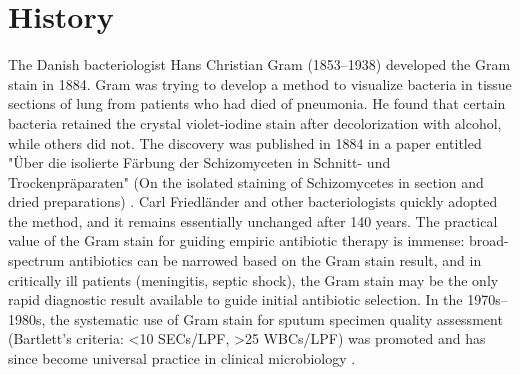 \section*{History}
The Danish bacteriologist Hans Christian Gram (1853--1938) developed the Gram stain in 1884. Gram was trying to develop a method to visualize bacteria in tissue sections of lung from patients who had died of pneumonia. He found that certain bacteria retained the crystal violet-iodine stain after decolorization with alcohol, while others did not. The discovery was published in 1884 in a paper entitled "Über die isolierte Färbung der Schizomyceten in Schnitt- und Trockenpräparaten" (On the isolated staining of Schizomycetes in section and dried preparations) \cite{popescu1996gram}. Carl Friedländer and other bacteriologists quickly adopted the method, and it remains essentially unchanged after 140 years. The practical value of the Gram stain for guiding empiric antibiotic therapy is immense: broad-spectrum antibiotics can be narrowed based on the Gram stain result, and in critically ill patients (meningitis, septic shock), the Gram stain may be the only rapid diagnostic result available to guide initial antibiotic selection. In the 1970s--1980s, the systematic use of Gram stain for sputum specimen quality assessment (Bartlett's criteria: <10 SECs/LPF, >25 WBCs/LPF) was promoted and has since become universal practice in clinical microbiology \cite{bartlett1987diagnosis}.

